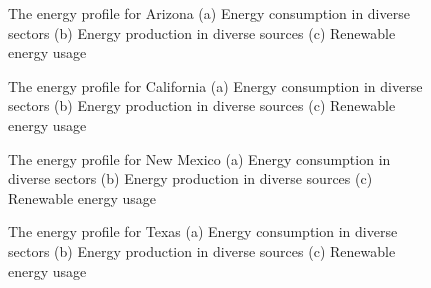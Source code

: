 \documentclass{mcmthesis}
\begin{document}
\begin{figure}[!h]
\hspace{\fill}
\hspace{\fill}
    \caption{The energy profile for Arizona (a) Energy consumption in diverse sectors (b) Energy production in diverse sources (c) Renewable energy usage}
    \label{fig:ep-az}
\end{figure}
\begin{figure}[!h]
\hspace{\fill}
\hspace{\fill}
    \caption{The energy profile for California (a) Energy consumption in diverse sectors (b) Energy production in diverse sources (c) Renewable energy usage}
    \label{fig:ep-ca}
\end{figure}
\begin{figure}[!h]
\hspace{\fill}
\hspace{\fill}
    \caption{The energy profile for New Mexico (a) Energy consumption in diverse sectors (b) Energy production in diverse sources (c) Renewable energy usage}
    \label{fig:ep-nm}
\end{figure}
\begin{figure}[!h]
\hspace{\fill}
\hspace{\fill}
    \caption{The energy profile for Texas (a) Energy consumption in diverse sectors (b) Energy production in diverse sources (c) Renewable energy usage}
    \label{fig:ep_tx}
\end{figure}
\end{document}
